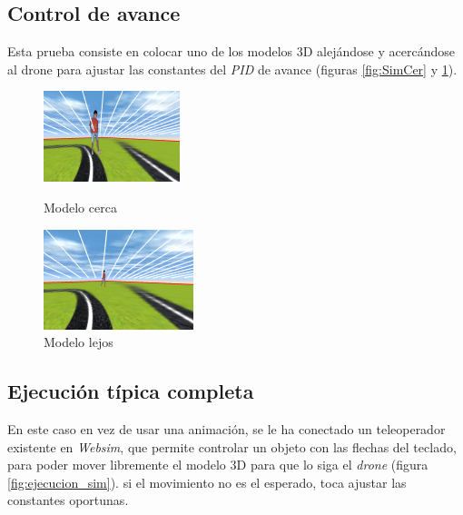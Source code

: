 \subsection*{Control de avance}
Esta prueba consiste en colocar uno de los modelos 3D alejándose y acercándose al drone para ajustar las constantes del \textit{PID} de avance (figuras \ref{fig:SimCer} y \ref{fig:SimLej}).

\begin{figure}[!htb]
    \includegraphics[width=\linewidth]{figures/simulado/cerca.png}
    \caption{Modelo cerca}\label{fig:SimCer}
\endminipage\hfill
{}
    \includegraphics[width=\linewidth]{figures/simulado/lejos.png}
    \caption{Modelo lejos}\label{fig:SimLej}
\endminipage\hfill
\end{figure}
\subsection*{Ejecución típica completa}
En este caso en vez de usar una animación, se le ha conectado un teleoperador existente en \textit{Websim}, que permite controlar un objeto con las flechas del teclado, para poder mover libremente el modelo 3D para que lo siga el \textit{drone} (figura \ref{fig:ejecucion_sim}). si el movimiento no es el esperado, toca ajustar las constantes oportunas.

